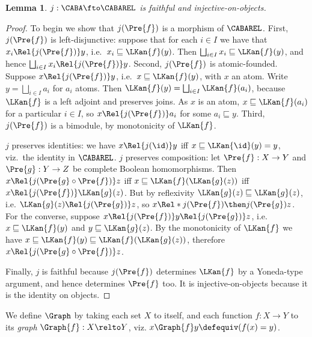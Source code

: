 \documentclass[10pt,a4paper]{article}
\newtheorem{lemma}[theorem]{Lemma}
\begin{document}
\begin{lemma}
  \label{lemma:j-faithful}
  \(j : \CABA \fto \CABAREL\) is faithful and injective-on-objects.
\end{lemma}
\begin{proof}
  To begin we show that \(j(\Pre{f})\) is a morphism of \(\CABAREL\). First,
  \(j(\Pre{f})\) is left-disjunctive: suppose that for each \(i \in I\) we have
  that \(x_i \Rel{j(\Pre{f})} y\), i.e.\ \(x_i \sqsubseteq \LKan{f}(y)\). Then
  \(\bigsqcup_{i \in I} x_i \sqsubseteq \LKan{f}(y)\), and hence \(\bigsqcup_{i
  \in I} x_i \Rel{j(\Pre{f})} y\).
  Second, \(j(\Pre{f})\) is atomic-founded. Suppose \(x \Rel{j(\Pre{f})} y\),
  i.e.\ \(x \sqsubseteq \LKan{f}(y)\), with \(x\) an atom. Write $y =
  \bigsqcup_{i \in I} a_i$ for $a_i$ atoms. Then $\LKan{f}(y) = \bigsqcup_{i \in
  I} \LKan{f}(a_i)$, because $\LKan{f}$ is a left adjoint and preserves joins.
  As \(x\) is an atom, $x \sqsubseteq \LKan{f}(a_i)$ for a particular $i \in I$, so $x
  \Rel{j(\Pre{f})} a_i$ for some $a_i \sqsubseteq y$.
  Third, $j(\Pre{f})$ is a bimodule, by monotonicity of $\LKan{f}$.

  $j$ preserves identities: we have \(x \Rel{j(\id)} y\) iff \(x \sqsubseteq
  \LKan{\id}(y) = y\), viz.\ the identity in \(\CABAREL\). $j$ preserves
  composition: let \(\Pre{f} : X \to Y\) and \(\Pre{g} : Y \to Z\) be complete
  Boolean homomorphisms. Then
  \(x \Rel{j(\Pre{g} \circ \Pre{f})} z\)
  iff
  \(x \sqsubseteq \LKan{f}(\LKan{g}(z))\)
  iff
  \(x \Rel{j(\Pre{f})} \LKan{g}(z)\).
  But by reflexivity
  $\LKan{g}(z) \sqsubseteq \LKan{g}(z)$,
  i.e.
  \(\LKan{g}(z) \Rel{j(\Pre{g})} z\),
  so
  \(x \Rel*{j(\Pre{f}) \then j(\Pre{g})} z\).
  For the converse, suppose
  \(x \Rel{j(\Pre{f})} y \Rel{j(\Pre{g})} z\),
  i.e.
  \(x \sqsubseteq \LKan{f}(y)\)
  and
  \(y \sqsubseteq \LKan{g}(z)\).
  By the monotonicity of \(\LKan{f}\) we have
  \(x \sqsubseteq \LKan{f}(y) \sqsubseteq \LKan{f}(\LKan{g}(z))\),
  therefore
  \(x \Rel{j({\Pre{g} \circ \Pre{f}})} z\).

  Finally, \(j\) is faithful because \(j(\Pre{f})\) determines \(\LKan{f}\) by a
  Yoneda-type argument, and hence determines \(\Pre{f}\) too. It is
  injective-on-objects because it is the identity on objects.
\end{proof}

We define $\Graph$ by taking each set $X$ to itself, and each function
\(f : X \to Y\) to its \emph{graph} \(\Graph{f} : X \relto Y\), viz.
\(x \Graph{f} y \defequiv (f(x) = y)\).
\end{document}
